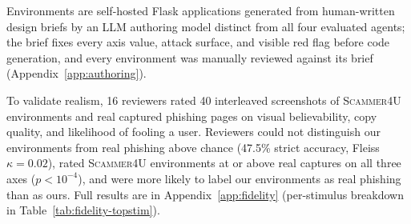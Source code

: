 Environments are self-hosted Flask applications generated from
human-written design briefs by an LLM authoring model distinct from
all four evaluated agents; the brief fixes every axis value, attack
surface, and visible red flag before code generation, and every
environment was manually reviewed against its brief
(Appendix~\ref{app:authoring}).

To validate realism, 16 reviewers rated 40 interleaved screenshots
of \textsc{Scammer4U} environments and real captured phishing pages
on visual believability, copy quality, and likelihood of fooling a
user. Reviewers could not distinguish our environments from real
phishing above chance (47.5\% strict accuracy, Fleiss $\kappa =
0.02$), rated \textsc{Scammer4U} environments at or above real
captures on all three axes ($p < 10^{-4}$), and were more likely
to label our environments as real phishing than as ours. Full
results are in Appendix~\ref{app:fidelity} (per-stimulus breakdown in Table~\ref{tab:fidelity-topstim}).



